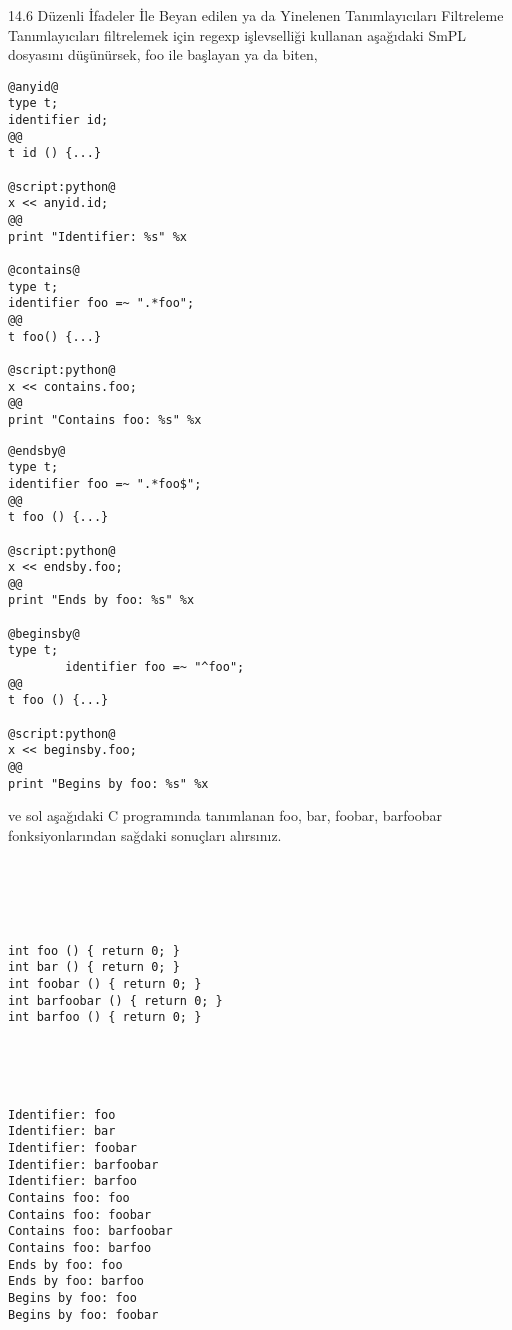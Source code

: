 \documentclass[22pt]{article}
\begin{document}
14.6 Düzenli İfadeler İle Beyan edilen ya da Yinelenen Tanımlayıcıları Filtreleme
\\
Tanımlayıcıları filtrelemek için regexp işlevselliği kullanan aşağıdaki SmPL dosyasını düşünürsek, foo ile başlayan ya da biten,
\\
\begin{multicols*}{2}
\begin{lstlisting}
@anyid@
type t;
identifier id;                          
@@                                      
t id () {...}                           

@script:python@                         
x << anyid.id;                          
@@                                      
print "Identifier: %s" %x               

@contains@                              
type t;                                 
identifier foo =~ ".*foo";              
@@                                      
t foo() {...}                           
 
@script:python@                         
x << contains.foo;                      
@@                                      
print "Contains foo: %s" %x
\end{lstlisting}
\columnbreak
\begin{lstlisting}
@endsby@
type t;
identifier foo =~ ".*foo$";
@@
t foo () {...}

@script:python@ 
x << endsby.foo;
@@
print "Ends by foo: %s" %x

@beginsby@
type t;
        identifier foo =~ "^foo"; 
@@
t foo () {...}

@script:python@
x << beginsby.foo;
@@
print "Begins by foo: %s" %x
\end{lstlisting}
\end{multicols*}
ve sol aşağıdaki C programında tanımlanan foo, bar, foobar, barfoobar fonksiyonlarından sağdaki sonuçları alırsınız.
\\
\begin{multicols*}{2}
\begin{lstlisting}
                                        


                                        
                                        
int foo () { return 0; }                
int bar () { return 0; }                
int foobar () { return 0; }             
int barfoobar () { return 0; }          
int barfoo () { return 0; }             
                                        
                                        
                                        
                                        
\end{lstlisting}
\columnbreak
\begin{lstlisting}
Identifier: foo
Identifier: bar
Identifier: foobar
Identifier: barfoobar
Identifier: barfoo
Contains foo: foo
Contains foo: foobar
Contains foo: barfoobar
Contains foo: barfoo
Ends by foo: foo
Ends by foo: barfoo
Begins by foo: foo
Begins by foo: foobar
\end{lstlisting}
\end{multicols*}
\end{document}
